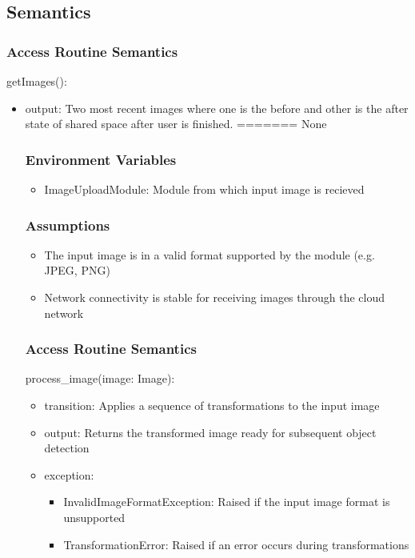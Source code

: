 \documentclass[12pt, titlepage]{article}
\begin{document}
\subsection{Semantics}


\subsubsection{Access Routine Semantics}

\noindent getImages():
\begin{itemize}
\item output: Two most recent images where one is the before and other is the after state of shared space after user is finished. 
=======
None



\subsubsection{Environment Variables}
\begin{itemize}
  \item ImageUploadModule: Module from which input image is recieved
\end{itemize}

\subsubsection{Assumptions}
\begin{itemize}
  \item The input image is in a valid format supported by the module (e.g. JPEG, PNG)
  \item Network connectivity is stable for receiving images through the cloud network
\end{itemize}


\subsubsection{Access Routine Semantics}

\noindent process{\_}image(image: Image):
\begin{itemize}
\item transition: Applies a sequence of transformations to the input image 
\item output: Returns the transformed image ready for subsequent object detection
\item exception: 
\begin{itemize}
  \item InvalidImageFormatException: Raised if the input image format is unsupported
  \item TransformationError: Raised if an error occurs during transformations
\end{itemize}


\end{itemize}
\end{itemize}
\end{document}
